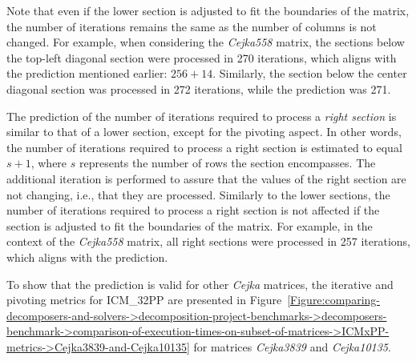 Note that even if the lower section is adjusted to fit the boundaries of the matrix, the number of iterations remains the same as the number of columns is not changed.
For example, when considering the \textit{Cejka558} matrix, the sections below the top-left diagonal section were processed in 270 iterations, which aligns with the prediction mentioned earlier: $256 + 14$.
Similarly, the section below the center diagonal section was processed in 272 iterations, while the prediction was 271.

The prediction of the number of iterations required to process a \textit{right section} is similar to that of a lower section, except for the pivoting aspect.
In other words, the number of iterations required to process a right section is estimated to equal $s + 1$, where $s$ represents the number of rows the section encompasses.
The additional iteration is performed to assure that the values of the right section are not changing, i.e., that they are processed.
Similarly to the lower sections, the number of iterations required to process a right section is not affected if the section is adjusted to fit the boundaries of the matrix.
For example, in the context of the \textit{Cejka558} matrix, all right sections were processed in 257 iterations, which aligns with the prediction.

To show that the prediction is valid for other \textit{Cejka} matrices, the iterative and pivoting metrics for ICM\_32PP are presented in Figure~\ref{Figure:comparing-decomposers-and-solvers->decomposition-project-benchmarks->decomposers-benchmark->comparison-of-execution-times-on-subset-of-matrices->ICMxPP-metrics->Cejka3839-and-Cejka10135} for matrices \textit{Cejka3839} and \textit{Cejka10135}.

